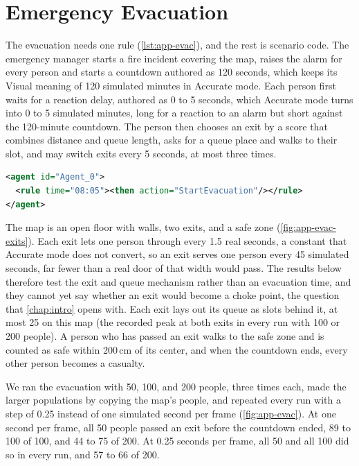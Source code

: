 \section{Emergency Evacuation}
\label{sec:app-evac}

\label{sub:app-evac-authored}

The evacuation needs one rule (\cref{lst:app-evac}), and the rest is scenario code. The emergency manager starts a fire incident covering the map, raises the alarm for every person and starts a countdown authored as 120 seconds, which keeps its Visual meaning of 120 simulated minutes in Accurate mode. Each person first waits for a reaction delay, authored as 0 to 5 seconds, which Accurate mode turns into 0 to 5 simulated minutes, long for a reaction to an alarm but short against the 120-minute countdown. The person then chooses an exit by a score that combines distance and queue length, asks for a queue place and walks to their slot, and may switch exits every 5 seconds, at most three times.

\begin{lstlisting}[language=XML, caption={The evacuation schedule. The trigger is global and idempotent, so one coordinator is enough.}, label={lst:app-evac}]
<agent id="Agent_0">
  <rule time="08:05"><then action="StartEvacuation"/></rule>
</agent>
\end{lstlisting}

The map is an open floor with walls, two exits, and a safe zone (\cref{fig:app-evac-exits}). Each exit lets one person through every 1.5 real seconds, a constant that Accurate mode does not convert, so an exit serves one person every 45 simulated seconds, far fewer than a real door of that width would pass. The results below therefore test the exit and queue mechanism rather than an evacuation time, and they cannot yet say whether an exit would become a choke point, the question that \cref{chap:intro} opens with. Each exit lays out its queue as slots behind it, at most 25 on this map (the recorded peak at both exits in every run with 100 or 200 people). A person who has passed an exit walks to the safe zone and is counted as safe within 200\,cm of its center, and when the countdown ends, every other person becomes a casualty.

\label{sub:app-evac-results}

We ran the evacuation with 50, 100, and 200 people, three times each, made the larger populations by copying the map's people, and repeated every run with a step of 0.25 instead of one simulated second per frame (\cref{fig:app-evac}). At one second per frame, all 50 people passed an exit before the countdown ended, 89 to 100 of 100, and 44 to 75 of 200. At 0.25 seconds per frame, all 50 and all 100 did so in every run, and 57 to 66 of 200.

